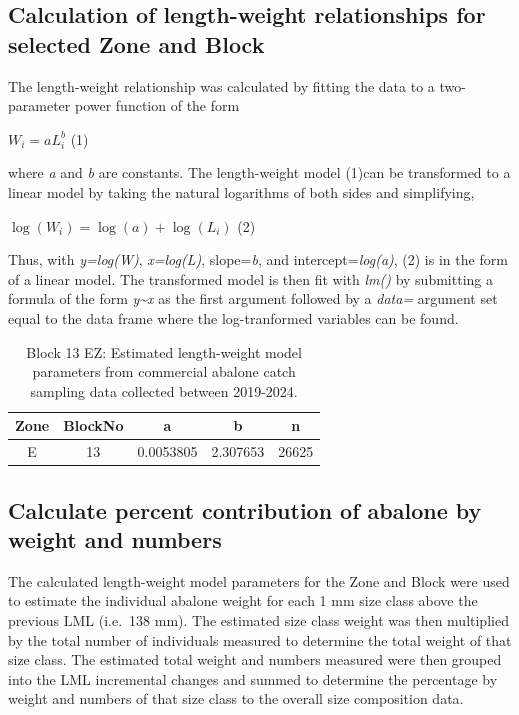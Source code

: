 \documentclass[
]{article}
\begin{document}
\subsection{Calculation of length-weight relationships for selected Zone and Block}\label{calculation-of-length-weight-relationships-for-selected-zone-and-block}

The length-weight relationship was calculated by fitting the data to a two-parameter power function of the form

\(W_{i} = aL_{i}^{b}\) (1)

where \emph{a} and \emph{b} are constants. The length-weight model (1)can be transformed to a linear model by taking the natural logarithms of both sides and simplifying,

\(\log(W_{i}) = \log(a) + \log(L_{i})\) (2)

Thus, with \emph{y=log(W)}, \emph{x=log(L)}, slope=\emph{b}, and intercept=\emph{log(a)}, (2) is in the form of a linear model. The transformed model is then fit with \emph{lm()} by submitting a formula of the form \emph{y\textasciitilde x} as the first argument followed by a \emph{data=} argument set equal to the data frame where the log-tranformed variables can be found.

\begin{table}

\caption{\label{tab:lengthweightrelationship}Block 13 EZ: Estimated length-weight model parameters from commercial abalone catch sampling data collected between 2019-2024.}
\centering
\begin{tabular}[t]{ccccc}
\toprule
Zone & BlockNo & a & b & n\\
\midrule
E & 13 & 0.0053805 & 2.307653 & 26625\\
\bottomrule
\end{tabular}
\end{table}

\subsection{Calculate percent contribution of abalone by weight and numbers}\label{calculate-percent-contribution-of-abalone-by-weight-and-numbers}

The calculated length-weight model parameters for the Zone and Block were used to estimate the individual abalone weight for each 1 mm size class above the previous LML (i.e.~138 mm). The estimated size class weight was then multiplied by the total number of individuals measured to determine the total weight of that size class. The estimated total weight and numbers measured were then grouped into the LML incremental changes and summed to determine the percentage by weight and numbers of that size class to the overall size composition data.
\end{document}

